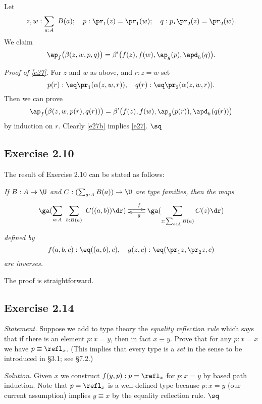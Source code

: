 \documentclass[12pt]{article}
\begin{document}
Let 
$$
z,w:\sum_{a:A}\ B(a);\quad p:\pr_1(z)=\pr_1(w);\quad q:p_\star \pr_2(z)=\pr_2(w).
$$ 
We claim 
\begin{equation}\label{e27}
\ap_f\big(\beta(z,w,p,q)\big)=\beta'\big(f(z),f(w),\ap_g(p),\apd_h(q)\big).
\end{equation}

\nn\emph{Proof of \eqref{e27}.} For $z$ and $w$ as above, and $r:z=w$ set 
$$
p(r):\eq\pr_1(\alpha(z,w,r)),\quad q(r):\eq\pr_2(\alpha(z,w,r)).
$$ 
Then we can prove 
\begin{equation}\label{e27b}
\ap_f\big(\beta(z,w,p(r),q(r))\big)=\beta'\big(f(z),f(w),\ap_g(p(r)),\apd_h(q(r))\big)
\end{equation}
by induction on $r$. Clearly \eqref{e27b} implies \eqref{e27}. $\sq$


\subsection{Exercise 2.10}\label{210}

The result of Exercise 2.10 can be stated as follows:

\emph{If $B:A\to\U$ and $C:(\sum_{a:A}B(a))\to\U$ are type families, then the maps
$$
\xymatrix{
\displaystyle\ga(\sum_{a:A}\ \sum_{b:B(a)}\ C((a,b))\dr)\ar@<2pt>[r]^(.55)f&\displaystyle\ga(\sum_{z:\sum_{a:A}B(a)}C(z)\dr)\ar@<2pt>[l]^(.45)g}
$$ 
defined by 
$$
f(a,b,c):\eq((a,b),c),\quad g(z,c):\eq(\pr_1 z,\pr_2z,c)
$$ 
are inverses.}

The proof is straightforward.


\subsection{Exercise 2.14}

\emph{Statement.} Suppose we add to type theory the \emph{equality reflection rule} which says that if there is an element $p:x=y$, then in fact $x\equiv y$. Prove that for any $p:x=x$ we have $p\equiv\refl_x$. (This implies that every type is a \emph{set} in the sense to be introduced in \S3.1; see \S7.2.)

\nn\emph{Solution.} Given $x$ we construct $f(y,p):p=\refl_x$ for $p:x=y$ by based path induction. Note that $p=\refl_x$ is a well-defined type because $p:x=y$ (our current assumption) implies $y\equiv x$ by the equality reflection rule. $\sq$

\end{document}
